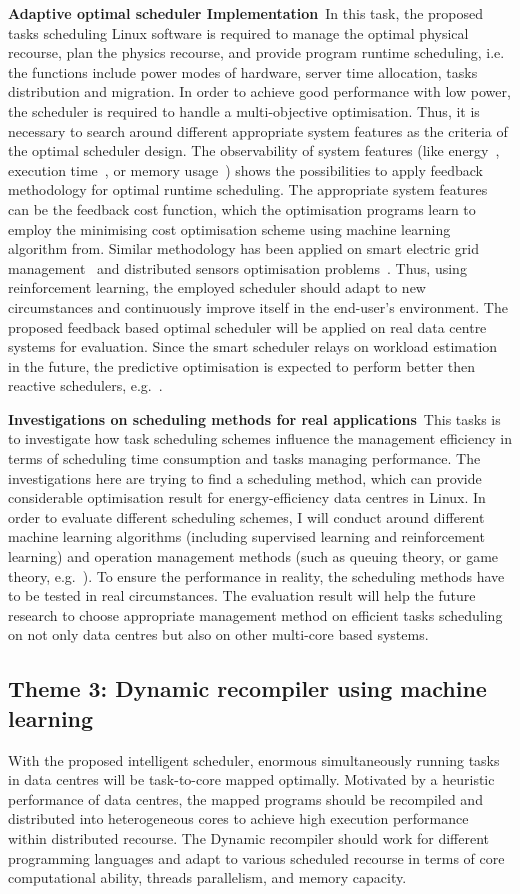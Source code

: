 \textbf{Adaptive optimal scheduler Implementation}~In this task, the proposed tasks scheduling Linux software is required to manage the optimal physical recourse, plan the physics recourse, and provide program runtime scheduling, i.e. the functions include power modes of hardware, server time allocation, tasks distribution and migration. In order to achieve good performance with low power, the scheduler is required to handle a multi-objective optimisation. Thus, it is necessary to search around different appropriate system features as the criteria of the optimal scheduler design. The observability of system features (like energy~\cite{energy-aware}, execution time~\cite{multicore}, or memory usage~\cite{ma}) shows the possibilities to apply feedback methodology for optimal runtime scheduling. The appropriate system features can be the feedback cost function, which the optimisation programs learn to employ the minimising cost optimisation scheme using machine learning algorithm from. Similar methodology has been applied on smart electric grid management~\cite{powergrid} and distributed sensors optimisation problems~\cite{distributedsensors}. Thus, using reinforcement learning, the employed scheduler should adapt to new circumstances and continuously improve itself in the end-user's environment. The proposed feedback based optimal scheduler will be applied on real data centre systems for evaluation. Since the smart scheduler relays on workload estimation in the future, the predictive optimisation is expected to perform better then reactive schedulers, e.g.~\cite{energy-aware}.

\textbf{Investigations on scheduling methods for real applications}~This tasks is to investigate how task scheduling schemes influence the management efficiency in terms of scheduling time consumption and tasks managing performance. The investigations here are trying to find a scheduling method, which can provide considerable optimisation result for energy-efficiency data centres in Linux. In order to evaluate different scheduling schemes, I will conduct around different machine learning algorithms (including supervised learning and reinforcement learning) and operation management methods (such as queuing theory, or game theory, e.g.~\cite{game}). To ensure the performance in reality, the scheduling methods have to be tested in real circumstances. The evaluation result will help the future research to choose appropriate management method on efficient tasks scheduling on not only data centres but also on other multi-core based systems. 
\subsection{Theme 3: Dynamic recompiler using machine learning}
With the proposed intelligent scheduler, enormous simultaneously running tasks in data centres will be task-to-core mapped optimally. Motivated by a heuristic performance of data centres, the mapped programs should be recompiled and distributed into heterogeneous cores to achieve high execution performance within distributed recourse. The Dynamic recompiler should work for different programming languages and adapt to various scheduled recourse in terms of core computational ability, threads parallelism, and memory capacity.

